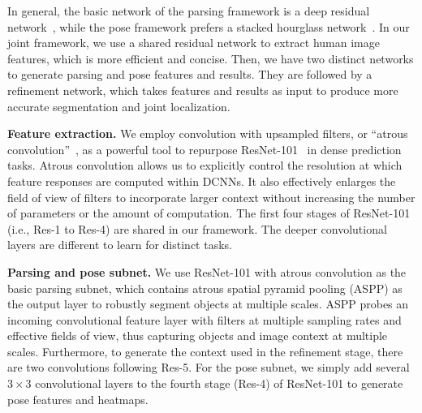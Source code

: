 \documentclass[10pt,journal,compsoc]{IEEEtran}
\begin{document}
In general, the basic network of the parsing framework is a deep residual network~\cite{he2015deep}, while the pose framework prefers a stacked hourglass network~\cite{newell2016stacked}. In our joint framework, we use a shared residual network to extract human image features, which is more efficient and concise. Then, we have two distinct networks to generate parsing and pose features and results. They are followed by a refinement network, which takes features and results as input to produce more accurate segmentation and joint localization.

\textbf{Feature extraction.}
We employ convolution with upsampled filters, or ``atrous convolution''~\cite{chen2016deeplab}, as a powerful tool to repurpose ResNet-101~\cite{he2015deep} in dense prediction tasks. Atrous convolution allows us to explicitly control the resolution at which feature responses are computed within DCNNs. It also effectively enlarges the field of view of filters to incorporate larger context without increasing the number of parameters or the amount of computation. The first four stages of ResNet-101 (i.e., Res-1 to Res-4) are shared in our framework. The deeper convolutional layers are different to learn for distinct tasks.

\textbf{Parsing and pose subnet.}
We use ResNet-101 with atrous convolution as the basic parsing subnet, which contains atrous spatial pyramid pooling (ASPP) as the output layer to robustly segment objects at multiple scales. ASPP probes an incoming convolutional feature layer with filters at multiple sampling rates and effective fields of view, thus capturing objects and image context at multiple scales. Furthermore, to generate the context used in the refinement stage, there are two convolutions following Res-5. For the pose subnet, we simply add several $3\times3$ convolutional layers to the fourth stage (Res-4) of ResNet-101 to generate pose features and heatmaps.
\end{document}

